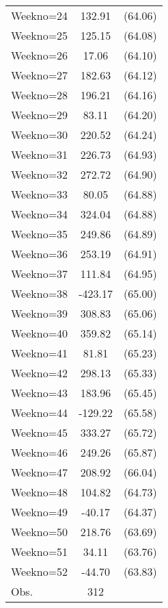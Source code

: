 {\begin{tabular}{l*{1}{cc}}
Weekno=24       &   132.91&  (64.06)\\
Weekno=25       &   125.15&  (64.08)\\
Weekno=26       &    17.06&  (64.10)\\
Weekno=27       &   182.63&  (64.12)\\
Weekno=28       &   196.21&  (64.16)\\
Weekno=29       &    83.11&  (64.20)\\
Weekno=30       &   220.52&  (64.24)\\
Weekno=31       &   226.73&  (64.93)\\
Weekno=32       &   272.72&  (64.90)\\
Weekno=33       &    80.05&  (64.88)\\
Weekno=34       &   324.04&  (64.88)\\
Weekno=35       &   249.86&  (64.89)\\
Weekno=36       &   253.19&  (64.91)\\
Weekno=37       &   111.84&  (64.95)\\
Weekno=38       &  -423.17&  (65.00)\\
Weekno=39       &   308.83&  (65.06)\\
Weekno=40       &   359.82&  (65.14)\\
Weekno=41       &    81.81&  (65.23)\\
Weekno=42       &   298.13&  (65.33)\\
Weekno=43       &   183.96&  (65.45)\\
Weekno=44       &  -129.22&  (65.58)\\
Weekno=45       &   333.27&  (65.72)\\
Weekno=46       &   249.26&  (65.87)\\
Weekno=47       &   208.92&  (66.04)\\
Weekno=48       &   104.82&  (64.73)\\
Weekno=49       &   -40.17&  (64.37)\\
Weekno=50       &   218.76&  (63.69)\\
Weekno=51       &    34.11&  (63.76)\\
Weekno=52       &   -44.70&  (63.83)\\
\hline
Obs.            &      312&         \\
\hline\hline
\end{tabular}
}
